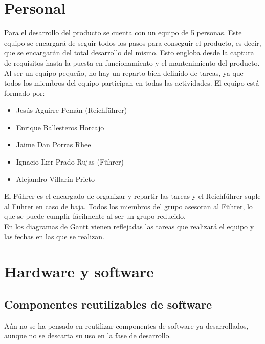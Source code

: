 \documentclass[spanish,a4paper,11pt, twoside]{report}	%
\begin{document}
	\section{Personal}
		Para el desarrollo del producto se cuenta con un equipo de 5 personas. Este
		equipo se encargará de seguir todos los pasos para conseguir el producto, es
		decir, que se encargarán del total desarrollo del mismo. Esto engloba desde la
		captura de requisitos hasta la puesta en funcionamiento y el mantenimiento del
		producto.\\
		Al ser un equipo pequeño, no hay un reparto bien definido de tareas, ya que todos
		los miembros del equipo participan en todas las actividades. 
		El equipo está formado por: 
		\begin{itemize}
		  \item Jesús Aguirre Pemán (Reichführer)
		  \item Enrique Ballesteros Horcajo
		  \item Jaime Dan Porras Rhee
		  \item Ignacio Iker Prado Rujas (Führer)
		  \item Alejandro Villarín Prieto
		\end{itemize}
		El Führer es el encargado de organizar y repartir las tareas y el Reichführer suple al Führer en caso de baja.
		Todos los miembros del grupo asesoran al Führer, lo que se puede cumplir fácilmente al ser un grupo reducido.\\
		En los diagramas de Gantt vienen reflejadas las tareas que realizará el equipo y las fechas en las que se realizan.
		
	\section{Hardware y software}

		\subsection{Componentes reutilizables de software}
			Aún no se ha pensado en reutilizar componentes de software ya desarrollados, aunque no se descarta su uso
			en la fase de desarrollo.
\end{document}
